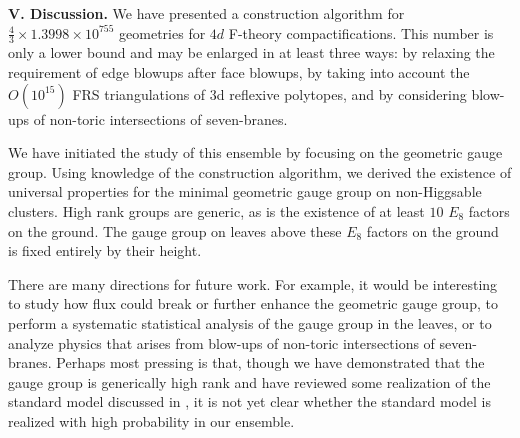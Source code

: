 \documentclass[aps,prl,twocolumn, superscriptaddress,groupedaddress,nofootinbib]{revtex4-1}
\begin{document}
\vspace{.2cm}
\noindent \textbf{V. Discussion.} 
We have presented a construction algorithm for  $\frac43 \times 1.3998\times
10^{755}$ geometries for $4d$ F-theory compactifications. This number is only
a lower bound and may be enlarged in at least three ways: by relaxing
the requirement of edge blowups after  face blowups, by taking into account
the $O(10^{15})$ FRS triangulations of 3d reflexive polytopes, and by
considering blow-ups of non-toric intersections of seven-branes.

We have initiated the study of this ensemble by focusing on the geometric gauge group.
Using knowledge of the construction algorithm, we derived the existence of universal
properties for the minimal geometric gauge group on non-Higgsable clusters. High
rank groups are generic, as is the existence of at least $10$ $E_8$ factors on the ground.
The gauge group on leaves above these $E_8$ factors on the ground is fixed entirely by their height.

There are many directions for future work. For example, it would be
interesting to study how flux could break or further enhance the geometric gauge group, to
perform a systematic statistical analysis of the gauge group in the leaves, or to analyze
physics that arises from blow-ups of non-toric intersections of seven-branes. 
Perhaps most pressing is that, though we have demonstrated that the gauge group is generically 
high rank and have reviewed some realization of the standard model discussed in \cite{Grassi:2014zxa}, it is not yet clear whether the standard model is realized with high probability in our ensemble.

\end{document}
